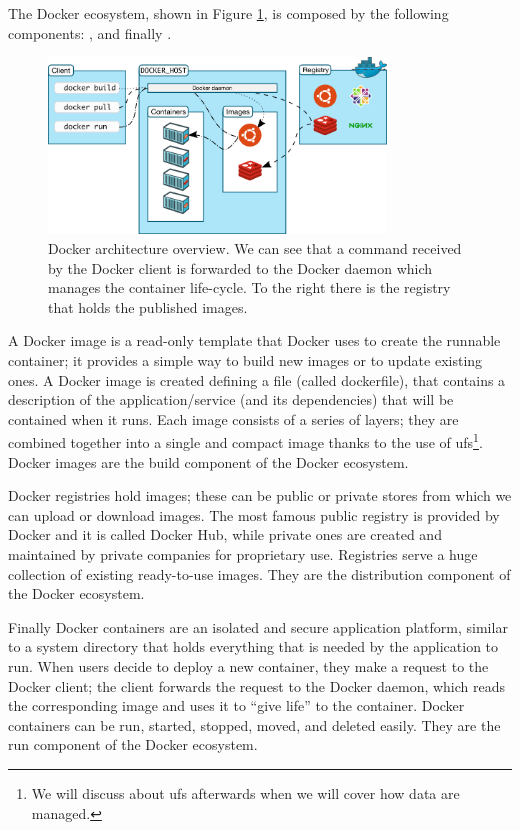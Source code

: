 The Docker ecosystem, shown in Figure \ref{img:background-deployments-docker-architecture-architecture},
is composed by the following components: ,  and finally
.

\begin{figure}
	\centering{}
	\includegraphics[width=0.8\textwidth]{chapters/background/images/docker-architecture.png}
	\caption[Docker architecture overview]{Docker architecture overview. We can see that a command
		received by the Docker client is forwarded to the Docker daemon which manages the container
		life-cycle. To the right there is the registry that holds the published images.}
	\label{img:background-deployments-docker-architecture-architecture}
\end{figure}

A Docker image is a read-only template that Docker uses to create the runnable container; it provides
a simple way to build new images or to update existing ones. A Docker image is created defining a
file (called dockerfile), that contains a description of the application/service (and its dependencies)
that will be contained when it runs. Each image consists of a series of layers; they are combined together
into a single and compact image thanks to the use of \acf{ufs}\footnote{We will discuss about \ac{ufs}
	afterwards when we will cover how data are managed.}. Docker images are the build component of the
Docker ecosystem.

Docker registries hold images; these can be public or private stores from which we can upload or
download images. The most famous public registry is provided by Docker and it is called Docker Hub, while
private ones are created and maintained by private companies for proprietary use. Registries serve a
huge collection of existing ready-to-use images. They are the distribution component of the Docker
ecosystem.

Finally Docker containers are an isolated and secure application platform, similar to a system directory
that holds everything that is needed by the application to run. When users decide to deploy a new
container, they make a request to the Docker client; the client forwards the request to the Docker
daemon, which reads the corresponding image and uses it to “give life” to the container. Docker containers
can be run, started, stopped, moved, and deleted easily. They are the run component of the Docker ecosystem.

